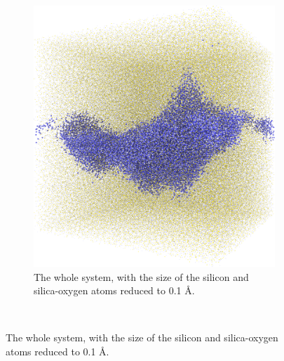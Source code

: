 \begin{figure}[!p]
{\begin{subfigure}[t]{\myfigwidth}
            \includegraphics[width=\textwidth]{images/systems/trimmed-rough_fracture01_abel_15}%
            \caption{The whole system, with the size of the silicon and silica-oxygen atoms reduced to 0.1 \AA.}%
        \end{subfigure}%
    }%
        \vspace{10pt}\\%
\end{figure}
